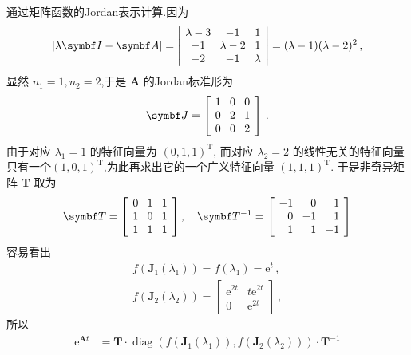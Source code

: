 \documentclass[list,answers,csize4,custom]{sysuexam}
\begin{document}
\begin{groups}
\begin{questions}[rst]
    \begin{solution}[10cm]
    \answers \method 通过矩阵函数的Jordan表示计算.因为$$
		|\lambda \boldsymbol{I}-\boldsymbol{A}|=\left|\lk\begin{array}{ccc}
			\lambda-3 & -1        & 1       \\
			-1        & \lambda-2 & 1       \\
			-2        & -1        & \lambda
		\end{array}\right|=(\lambda-1)(\lambda-2)^{2}\,,
	$$
	显然 $n_{1}=1, n_{2}=2$,于是 $\boldsymbol{A}$ 的Jordan标准形为
	$$
		\boldsymbol{J}=\left[\lk\begin{array}{lll}
				1 & 0 & 0 \\
				0 & 2 & 1 \\
				0 & 0 & 2
			\end{array}\right]\,.
	$$
	由于对应 $\lambda_{1}=1$ 的特征向量为 $(0,1,1)^{\mathrm{T}}$, 而对应 $\lambda_{2}=2$ 的线性无关的特征向量只有一个$(1,0,1)^{\mathrm{T}}$,为此再求出它的一个广义特征向量 $(1,1,1)^{\mathrm{T}}$. 于是非奇异矩阵 $\symbf{T}$ 取为
	$$
		\boldsymbol{T}=\left[\lk\begin{array}{lll}
				0 & 1 & 1 \\
				1 & 0 & 1 \\
				1 & 1 & 1
			\end{array}\right], \quad \boldsymbol{T}^{-1}=\left[\lk\begin{array}{rrr}
				-1 & 0  & 1  \\
				0  & -1 & 1  \\
				1  & 1  & -1
			\end{array}\right]
	$$
	容易看出
	$$
		\begin{array}{l}
			f\left(\boldsymbol{J}_{1}\left(\lambda_{1}\right)\right)=f\left(\lambda_{1}\right)=\mathrm{e}^{t}\,, \\
			f\left(\boldsymbol{J}_{2}\left(\lambda_{2}\right)\right)=\left[\begin{array}{cc}
					\mathrm{e}^{2 t} & t \mathrm{e}^{2 t} \\
					0                & \mathrm{e}^{2 t}
				\end{array}\right]\,,
		\end{array}
	$$
	所以
	$$
		\begin{aligned}
			\mathrm{e}^{\symbf{A} t} & =\boldsymbol{T} \cdot \operatorname{diag}\left(f\left(\boldsymbol{J}_{1}\left(\lambda_{1}\right)\right), f\left(\boldsymbol{J}_{2}\left(\lambda_{2}\right)\right)\right) \cdot \boldsymbol{T}^{-1} \\

\end{aligned}$$
\end{solution}
\end{questions}
\end{groups}
\end{document}
